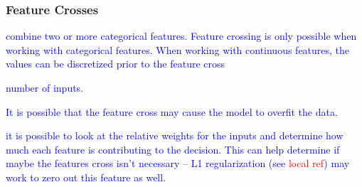 \subsubsection{Feature Crosses}


\textcolor{blue}{combine two or more categorical features. Feature crossing is only possible when working with categorical features. When working with continuous features, the values can be discretized prior to the feature cross}



\textcolor{blue}{number of inputs.}

\textcolor{blue}{It is possible that the feature cross may cause the model to overfit the data.}


\textcolor{blue}{it is possible to look at the relative weights for the inputs and determine how much each feature is contributing to the decision. This can help determine if maybe the features cross isn't necessary -- L1 regularization (see \textcolor{red}{local ref}) may work to zero out this feature as well.}



